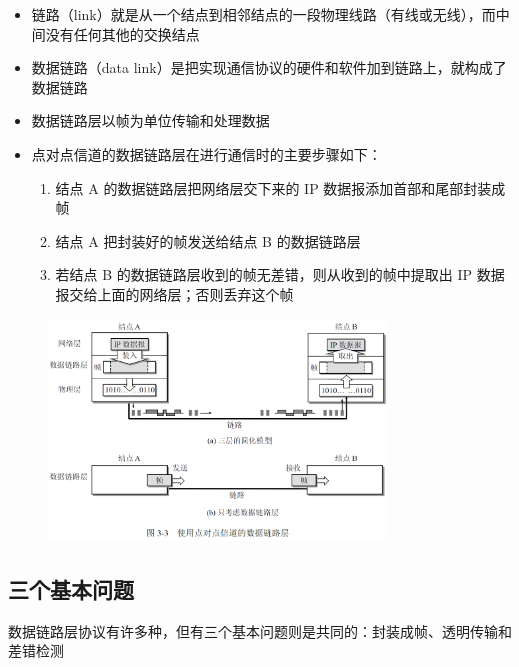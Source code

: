 \documentclass[cs4size,a4paper,10pt]{ctexart}
\begin{document}
	\begin{itemize}
		\item 链路（link）就是从一个结点到相邻结点的一段物理线路（有线或无线），而中间没有任何其他的交换结点
		\item 数据链路（data link）是把实现通信协议的硬件和软件加到链路上，就构成了数据链路
		\item 数据链路层以帧为单位传输和处理数据
		\item 点对点信道的数据链路层在进行通信时的主要步骤如下：
		\begin{enumerate}[label=\arabic*.]
			\item 结点 A 的数据链路层把网络层交下来的 IP 数据报添加首部和尾部封装成帧
			\item 结点 A 把封装好的帧发送给结点 B 的数据链路层
			\item 若结点 B 的数据链路层收到的帧无差错，则从收到的帧中提取出 IP 数据报交给上面的网络层；否则丢弃这个帧
		\end{enumerate}
	\end{itemize}

	\begin{figure}[H]
		\centering
		\includegraphics[width=0.8\textwidth]{img/3.3}
	\end{figure}

	\subsection{三个基本问题}
	数据链路层协议有许多种，但有三个基本问题则是共同的：封装成帧、透明传输和差错检测
\end{document}

